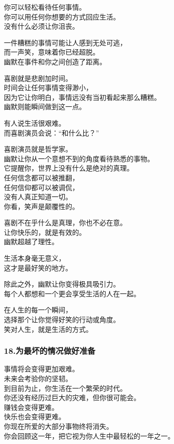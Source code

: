 \documentclass[
]{article}
\begin{document}
你可以轻松看待任何事情。\\
你可以用任何你想要的方式回应生活。\\
没有什么必须让你沮丧。

一件糟糕的事情可能让人感到无处可逃，\\
而一声笑，意味着你已经超脱。\\
幽默在事件和你之间创造了距离。

喜剧就是悲剧加时间。\\
时间会让任何事情变得渺小，\\
因为它让你明白，事情远没有当初看起来那么糟糕。\\
幽默则能瞬间做到这一点。

有人说生活很艰难。\\
而喜剧演员会说：``和什么比？''

喜剧演员就是哲学家。\\
幽默让你从一个意想不到的角度看待熟悉的事物。\\
它提醒你，世界上没有什么是绝对的真理。\\
任何信念都可以被推翻，\\
任何信仰都可以被调侃，\\
没有人真正知道一切。\\
你看，笑声是颠覆性的。

喜剧不在乎什么是真理，你也不必在意。\\
让你快乐的，就是有效的。\\
幽默超越了理性。

生活本身毫无意义，\\
这才是最好笑的地方。

除此之外，幽默让你变得极具吸引力。\\
每个人都想和一个更会享受生活的人在一起。

在人生的每一个瞬间，\\
选择那个让你觉得好笑的行动或角度。\\
笑对人生，就是生活的方式。

\subsubsection{18.为最坏的情况做好准备}\label{18ux4e3aux6700ux574fux7684ux60c5ux51b5ux505aux597dux51c6ux5907}

事情将会变得更加艰难。\\
未来会考验你的坚韧。\\
到目前为止，你生活在一个繁荣的时代。\\
你还没有经历过巨大的灾难，但你很可能会。\\
赚钱会变得更难。\\
快乐也会变得更难。\\
你现在所爱的大部分事物终将消失。\\
你会回顾这一年，把它视为你人生中最轻松的一年之一。
\end{document}
